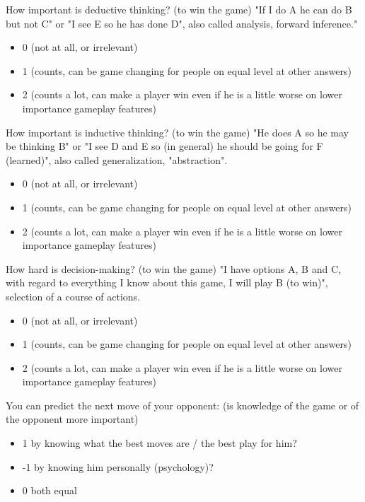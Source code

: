 How important is deductive thinking? (to win the game)
"If I do A he can do B but not C" or "I see E so he has done D", also called analysis, forward inference."
\begin{itemize}
    \item 0 (not at all, or irrelevant)
    \item 1 (counts, can be game changing for people on equal level at other answers)
    \item 2 (counts a lot, can make a player win even if he is a little worse on lower importance gameplay features)
\end{itemize}


How important is inductive thinking? (to win the game)
"He does A so he may be thinking B" or "I see D and E so (in general) he should be going for F (learned)", also called generalization, "abstraction".
\begin{itemize}
    \item 0 (not at all, or irrelevant)
    \item 1 (counts, can be game changing for people on equal level at other answers)
    \item 2 (counts a lot, can make a player win even if he is a little worse on lower importance gameplay features)
\end{itemize}


How hard is decision-making? (to win the game)
"I have options A, B and C, with regard to everything I know about this game, I will play B (to win)", selection of a course of actions.
\begin{itemize}
    \item 0 (not at all, or irrelevant)
    \item 1 (counts, can be game changing for people on equal level at other answers)
    \item 2 (counts a lot, can make a player win even if he is a little worse on lower importance gameplay features)
\end{itemize}


You can predict the next move of your opponent:
(is knowledge of the game or of the opponent more important)
\begin{itemize}
    \item 1 by knowing what the best moves are / the best play for him?
    \item -1 by knowing him personally (psychology)?
    \item 0 both equal
\end{itemize}


